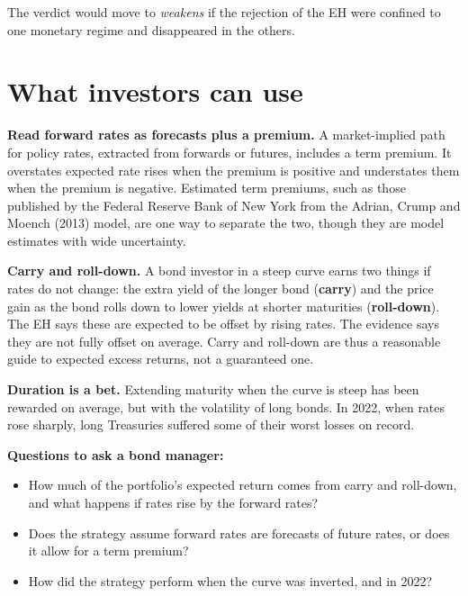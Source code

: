 The verdict would move to \emph{weakens} if the rejection of the EH were confined to one monetary regime and disappeared in the others.

\section{What investors can use}
\label{sec:16-investors}

\textbf{Read forward rates as forecasts plus a premium.} A market-implied path for policy rates, extracted from forwards or futures, includes a term premium. It overstates expected rate rises when the premium is positive and understates them when the premium is negative. Estimated term premiums, such as those published by the Federal Reserve Bank of New York from the Adrian, Crump and Moench (2013) model, are one way to separate the two, though they are model estimates with wide uncertainty.

\textbf{Carry and roll-down.} A bond investor in a steep curve earns two things if rates do not change: the extra yield of the longer bond (\textbf{carry}) and the price gain as the bond rolls down to lower yields at shorter maturities (\textbf{roll-down}). The EH says these are expected to be offset by rising rates. The evidence says they are not fully offset on average. Carry and roll-down are thus a reasonable guide to expected excess returns, not a guaranteed one.

\textbf{Duration is a bet.} Extending maturity when the curve is steep has been rewarded on average, but with the volatility of long bonds. In 2022, when rates rose sharply, long Treasuries suffered some of their worst losses on record.

\textbf{Questions to ask a bond manager:}

\begin{itemize}
  \item How much of the portfolio's expected return comes from carry and roll-down, and what happens if rates rise by the forward rates?
  \item Does the strategy assume forward rates are forecasts of future rates, or does it allow for a term premium?
  \item How did the strategy perform when the curve was inverted, and in 2022?
\end{itemize}

